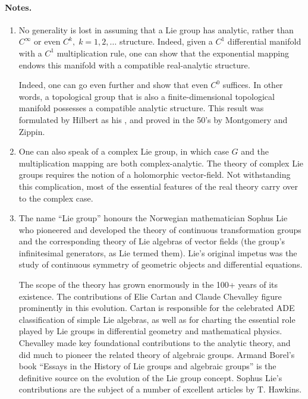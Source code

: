 \documentclass{article}
\begin{document}
\paragraph{Notes.}
\begin{enumerate}
\item 
No generality is lost in assuming that a Lie group has analytic,
rather than $C^\infty$ or even $C^k,\; k=1,2,\ldots$ structure.
Indeed, given a $C^1$ differential manifold with a $C^1$
multiplication rule, one can show that the exponential mapping endows
this manifold with a compatible real-analytic structure.  

Indeed, one can go even further and show that even $C^0$ suffices.  In
other words, a topological group that is also a finite-dimensional
topological manifold possesses a compatible analytic structure.  This
result was formulated by Hilbert as his , and
proved in the 50's by Montgomery and Zippin.


\item One can also speak of a complex Lie group, in which case $G$ and the
multiplication mapping are both complex-analytic.  The theory of
complex Lie groups requires the notion of a holomorphic vector-field.
Not withstanding this complication, most of the essential features of
the real theory carry over to the complex case.

\item The name ``Lie group'' honours the Norwegian mathematician
  Sophus Lie who pioneered and developed the theory of continuous
  transformation groups and the corresponding theory of Lie algebras
  of vector fields (the group's infinitesimal generators, as Lie
  termed them).  Lie's original impetus was the study of continuous
  symmetry of geometric objects and differential equations.  
  
  The scope of the theory has grown enormously in the 100+ years of
  its existence.  The contributions of Elie Cartan and Claude
  Chevalley figure prominently in this evolution. Cartan is
  responsible for the celebrated ADE classification of simple Lie
  algebras, as well as for charting the essential role played by Lie
  groups in differential geometry and mathematical physics.  Chevalley
  made key foundational contributions to the analytic theory, and did
  much to pioneer the related theory of algebraic groups.  Armand
  Borel's book ``Essays in the History of Lie groups and algebraic
  groups'' is the definitive source on the evolution of the Lie group
  concept.  Sophus Lie's contributions are the subject of a number of
  excellent articles by T. Hawkins.

\end{enumerate}
\end{document}
